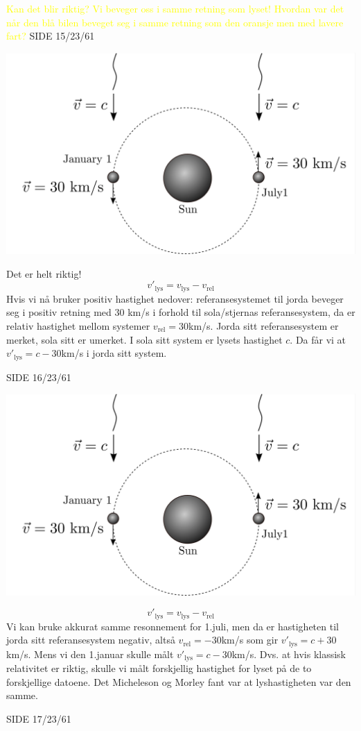 \documentclass{beamer}
\begin{document}
\begin{frame}
{
  \large
\textcolor{yellow}{Kan det blir riktig? Vi beveger oss i samme retning som lyset! Hvordan var det når den blå bilen beveget seg i samme retning som den oransje men med lavere fart?}
}{SIDE 15/23/61}

{
\centerline{\includegraphics[scale=0.55]{media/fig_7-3.png}}
Det er helt riktig!
\[
v'_\mathrm{lys}=v_\mathrm{lys}-v_\mathrm{rel}
\]
Hvis vi nå bruker positiv hastighet nedover: referansesystemet til jorda beveger seg i positiv retning med 30 km/s i forhold til sola/stjernas referansesystem, da er relativ hastighet mellom systemer $v_\mathrm{rel}=30$km/s. Jorda sitt referansesystem er merket, sola sitt er umerket. I sola sitt system er lysets hastighet $c$. Da får vi at $v'_\mathrm{lys}=c-30$km/s i jorda sitt system.
}{SIDE 16/23/61}

{
\centerline{\includegraphics[scale=0.55]{media/fig_7-3.png}}
\[
v'_\mathrm{lys}=v_\mathrm{lys}-v_\mathrm{rel}
\]
Vi kan bruke akkurat samme resonnement for 1.juli, men da er hastigheten til jorda sitt referansesystem negativ, altså $v_\mathrm{rel}=-30$km/s som gir $v'_\mathrm{lys}=c+30$km/s. Mens vi den 1.januar skulle målt  $v'_\mathrm{lys}=c-30$km/s. Dvs. at hvis klassisk relativitet er riktig, skulle vi målt forskjellig hastighet for lyset på de to forskjellige datoene. Det Micheleson og Morley fant var at lyshastigheten var den samme.
}{SIDE 17/23/61}




\end{frame}
\end{document}
